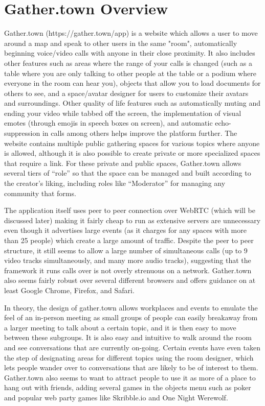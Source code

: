 \documentclass[bsc,frontabs,singlespacing,parskip,deptreport]{infthesis}
\begin{document}
\section{Gather.town Overview}

Gather.town (https://gather.town/app) is a website which allows a user to move around a map and speak to other users in the same "room", automatically beginning voice/video calls with anyone in their close proximity.  It also includes other features such as areas where the range of your calls is changed (such as a table where you are only talking to other people at the table or a podium where everyone in the room can hear you), objects that allow you to load documents for others to see, and a space/avatar designer for users to customize their avatars and surroundings.  Other quality of life features such as automatically muting and ending your video while tabbed off the screen, the implementation of visual emotes (through emojis in speech boxes on screen), and automatic echo-suppression in calls among others helps improve the platform further.  The website contains multiple public gathering spaces for various topics where anyone is allowed, although it is also possible to create private or more specialized spaces that require a link.  For these private and public spaces, Gather.town allows several tiers of “role” so that the space can be managed and built according to the creator's liking, including roles like “Moderator” for managing any community that forms.

The application itself uses peer to peer connection over WebRTC (which will be discussed later) making it fairly cheap to run as extensive servers are unnecessary even though it advertises large events (as it charges for any spaces with more than 25 people) which create a large amount of traffic.  Despite the peer to peer structure, it still seems to allow a large number of simultaneous calls (up to 9 video tracks simultaneously, and many more audio tracks), suggesting that the framework it runs calls over is not overly strenuous on a network.  Gather.town also seems fairly robust over several different browsers and offers guidance on at least Google Chrome, Firefox, and Safari.

In theory, the design of gather.town allows workplaces and events to emulate the feel of an in-person meeting as small groups of people can easily breakaway from a larger meeting to talk about a certain topic, and it is then easy to move between these subgroups.  It is also easy and intuitive to walk around the room and see conversations that are currently on-going.  Certain events have even taken the step of designating areas for different topics using the room designer, which lets people wander over to conversations that are likely to be of interest to them.  Gather.town also seems to want to attract people to use it as more of a place to hang out with friends, adding several games in the objects menu such as poker and popular web party games like Skribble.io and One Night Werewolf.
\end{document}
